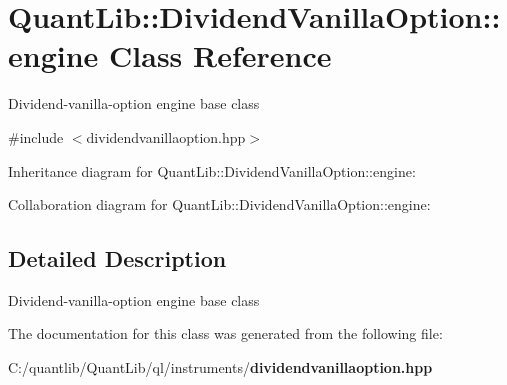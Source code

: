 \section{Quant\+Lib\+:\+:Dividend\+Vanilla\+Option\+:\+:engine Class Reference}
\label{class_quant_lib_1_1_dividend_vanilla_option_1_1engine}


Dividend-\/vanilla-\/option engine base class  




{\ttfamily \#include $<$dividendvanillaoption.\+hpp$>$}



Inheritance diagram for Quant\+Lib\+:\+:Dividend\+Vanilla\+Option\+:\+:engine\+:


Collaboration diagram for Quant\+Lib\+:\+:Dividend\+Vanilla\+Option\+:\+:engine\+:


\subsection{Detailed Description}
Dividend-\/vanilla-\/option engine base class 

The documentation for this class was generated from the following file\+:\begin{DoxyCompactItemize}
\item 
C\+:/quantlib/\+Quant\+Lib/ql/instruments/{\bf dividendvanillaoption.\+hpp}\end{DoxyCompactItemize}
